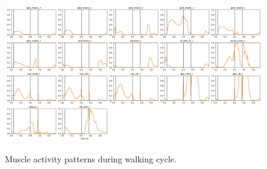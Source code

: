 \begin{figure}[t!]
\centering
\includegraphics[width=\textwidth]{figures/muscles_control_gait_example.png}\\
\caption{Muscle activity patterns during walking cycle.}
\label{fig:muscles_activation_gait}
\end{figure}
